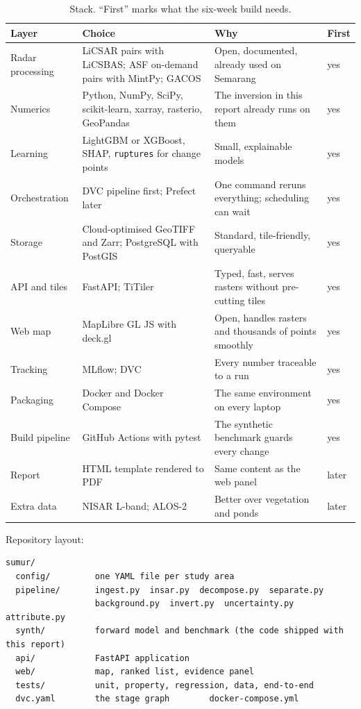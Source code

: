 {\small
\begin{xltabular}{\linewidth}{@{}L{27mm}L{45mm}Y L{9mm}@{}}
\caption{Stack. ``First'' marks what the six-week build needs.}\label{tab:stack}\\*
\toprule
\textbf{Layer} & \textbf{Choice} & \textbf{Why} & \textbf{First}\\*
\midrule
Radar processing & LiCSAR pairs with LiCSBAS; ASF on-demand pairs with MintPy; GACOS & Open, documented,
  already used on Semarang & yes\\
Numerics & Python, NumPy, SciPy, scikit-learn, xarray, rasterio, GeoPandas & The inversion in this report
  already runs on them & yes\\
Learning & LightGBM or XGBoost, SHAP, \texttt{ruptures} for change points & Small, explainable models & yes\\
Orchestration & DVC pipeline first; Prefect later & One command reruns everything; scheduling can wait & yes\\
Storage & Cloud-optimised GeoTIFF and Zarr; PostgreSQL with PostGIS & Standard, tile-friendly, queryable & yes\\
API and tiles & FastAPI; TiTiler & Typed, fast, serves rasters without pre-cutting tiles & yes\\
Web map & MapLibre GL JS with deck.gl & Open, handles rasters and thousands of points smoothly & yes\\
Tracking & MLflow; DVC & Every number traceable to a run & yes\\
Packaging & Docker and Docker Compose & The same environment on every laptop & yes\\
Build pipeline & GitHub Actions with pytest & The synthetic benchmark guards every change & yes\\
Report & HTML template rendered to PDF & Same content as the web panel & later\\
Extra data & NISAR L-band; ALOS-2 & Better over vegetation and ponds & later\\
\bottomrule
\end{xltabular}}

Repository layout:

{\small
\begin{verbatim}
sumur/
  config/         one YAML file per study area
  pipeline/       ingest.py  insar.py  decompose.py  separate.py
                  background.py  invert.py  uncertainty.py  attribute.py
  synth/          forward model and benchmark (the code shipped with this report)
  api/            FastAPI application
  web/            map, ranked list, evidence panel
  tests/          unit, property, regression, data, end-to-end
  dvc.yaml        the stage graph        docker-compose.yml
\end{verbatim}
}

